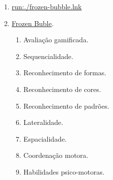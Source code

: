 \begin{enumerate}
	\item \url{run:./frozen-bubble.lnk}
	\item  \href{run:./frozen-bubble.lnk}{Frozen Buble}.
	\begin{enumerate}
		\item Avaliação gamificada.
		\item Sequencialidade.
		\item Reconhecimento de formas.
		\item Reconhecimento de cores.
		\item Reconhecimento de padrões.
		\item Lateralidade.
		\item Espacialidade.
		\item Coordenação motora.
		\item Habilidades psico-motoras.
	\end{enumerate}
\end{enumerate}
